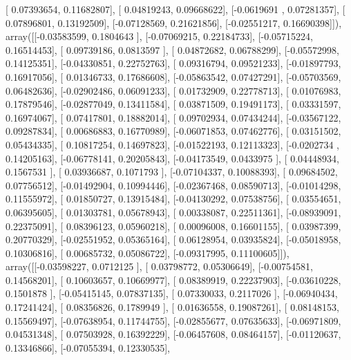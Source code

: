 \documentclass{article}
\begin{document}
       [ 0.07393654,  0.11682807],
       [ 0.04819243,  0.09668622],
       [-0.0619691 ,  0.07281357],
       [ 0.07896801,  0.13192509],
       [-0.07128569,  0.21621856],
       [-0.02551217,  0.16690398]]), array([[-0.03583599,  0.1804643 ],
       [-0.07069215,  0.22184733],
       [-0.05715224,  0.16514453],
       [ 0.09739186,  0.0813597 ],
       [ 0.04872682,  0.06788299],
       [-0.05572998,  0.14125351],
       [-0.04330851,  0.22752763],
       [ 0.09316794,  0.09521233],
       [-0.01897793,  0.16917056],
       [ 0.01346733,  0.17686608],
       [-0.05863542,  0.07427291],
       [-0.05703569,  0.06482636],
       [-0.02902486,  0.06091233],
       [ 0.01732909,  0.22778713],
       [ 0.01076983,  0.17879546],
       [-0.02877049,  0.13411584],
       [ 0.03871509,  0.19491173],
       [ 0.03331597,  0.16974067],
       [ 0.07417801,  0.18882014],
       [ 0.09702934,  0.07434244],
       [-0.03567122,  0.09287834],
       [ 0.00686883,  0.16770989],
       [-0.06071853,  0.07462776],
       [ 0.03151502,  0.05434335],
       [ 0.10817254,  0.14697823],
       [-0.01522193,  0.12113323],
       [-0.0202734 ,  0.14205163],
       [-0.06778141,  0.20205843],
       [-0.04173549,  0.0433975 ],
       [ 0.04448934,  0.1567531 ],
       [ 0.03936687,  0.1071793 ],
       [-0.07104337,  0.10088393],
       [ 0.09684502,  0.07756512],
       [-0.01492904,  0.10994446],
       [-0.02367468,  0.08590713],
       [-0.01014298,  0.11555972],
       [ 0.01850727,  0.13915484],
       [-0.04130292,  0.07538756],
       [ 0.03554651,  0.06395605],
       [ 0.01303781,  0.05678943],
       [ 0.00338087,  0.22511361],
       [-0.08939091,  0.22375091],
       [ 0.08396123,  0.05960218],
       [ 0.00096008,  0.16601155],
       [ 0.03987399,  0.20770329],
       [-0.02551952,  0.05365164],
       [ 0.06128954,  0.03935824],
       [-0.05018958,  0.10306816],
       [ 0.00685732,  0.05086722],
       [-0.09317995,  0.11100605]]), array([[-0.03598227,  0.0712125 ],
       [ 0.03798772,  0.05306649],
       [-0.00754581,  0.14568201],
       [ 0.10603657,  0.10669977],
       [ 0.08389919,  0.22237903],
       [-0.03610228,  0.1501878 ],
       [-0.05415145,  0.07837135],
       [ 0.07330033,  0.2117026 ],
       [-0.06940434,  0.17241424],
       [ 0.08356826,  0.1789949 ],
       [ 0.01636558,  0.19087261],
       [ 0.08148153,  0.15569497],
       [-0.07638954,  0.11744755],
       [-0.02855677,  0.07635633],
       [-0.06971809,  0.04531348],
       [ 0.07503928,  0.16392229],
       [-0.06457608,  0.08464157],
       [-0.01120637,  0.13346866],
       [-0.07055394,  0.12330535],
\end{document}
